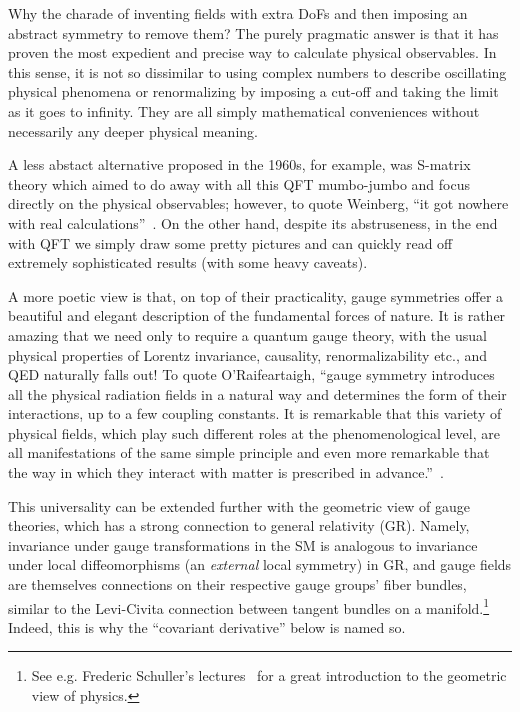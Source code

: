 Why the charade of inventing fields with extra DoFs and then imposing an abstract symmetry to remove them?
The purely pragmatic answer is that it has proven the most expedient and precise way to calculate physical observables.
In this sense, it is not so dissimilar to using complex numbers to describe oscillating physical phenomena or renormalizing by imposing a cut-off and taking the limit as it goes to infinity.
They are all simply mathematical conveniences without necessarily any deeper physical meaning.

A less abstact alternative proposed in the 1960s, for example, was S-matrix theory which aimed to do away with all this QFT mumbo-jumbo and focus directly on the physical observables; however, to quote Weinberg, ``it got nowhere with real calculations''~\cite{WeinbergCERNLecture}.
On the other hand, despite its abstruseness, in the end with QFT we simply draw some pretty pictures and can quickly read off extremely sophisticated results (with some heavy caveats).

A more poetic view is that, on top of their practicality, gauge symmetries offer a beautiful and elegant description of the fundamental forces of nature.
It is rather amazing that we need only to require a quantum \UU[1] gauge theory, with the usual physical properties of Lorentz invariance, causality, renormalizability etc., and QED naturally falls out!
To quote O'Raifeartaigh, ``gauge symmetry introduces all the physical radiation fields in a natural way and determines the form of their interactions, up to a few coupling constants. 
It is remarkable that this variety of physical fields, which play such different roles at the phenomenological level, are all manifestations of the same simple principle and even more remarkable that the way in which they interact with matter is prescribed in advance.''~\cite{ORaifeartaigh:1997dvq}.

This universality can be extended further with the geometric view of gauge theories, which has a strong connection to general relativity (GR).
Namely, invariance under gauge transformations in the SM is analogous to invariance under local diffeomorphisms (an \textit{external} local symmetry) in GR, and gauge fields are themselves connections on their respective gauge groups' fiber bundles, similar to the Levi-Civita connection between tangent bundles on a manifold.\footnote{See e.g. Frederic Schuller's lectures~\cite{SchullerGATP} for a great introduction to the geometric view of physics.}
Indeed, this is why the ``covariant derivative'' below is named so.

